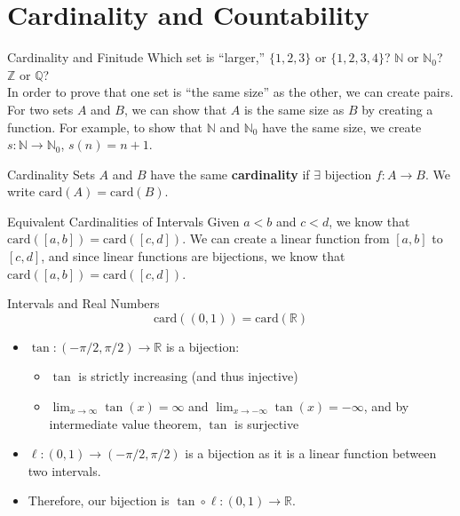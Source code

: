 \documentclass[10pt]{extarticle}
\begin{document}
  \section*{Cardinality and Countability}%
  \begin{problem}{Cardinality and Finitude}
    Which set is ``larger,'' $\{1,2,3\}$ or $\{1,2,3,4\}$? $\mathbb{N}$ or $\mathbb{N}_0$? $\mathbb{Z}$ or $\mathbb{Q}$?\\

    In order to prove that one set is ``the same size'' as the other, we can create pairs. For two sets $A$ and $B$, we can show that $A$ is the same size as $B$ by creating a function. For example, to show that $\mathbb{N}$ and $\mathbb{N}_0$ have the same size, we create $s:\mathbb{N} \rightarrow \mathbb{N}_0$, $s(n) = n+1$.

    \begin{problem}{Cardinality}
      Sets $A$ and $B$ have the same \textbf{cardinality} if $\exists$ bijection $f:A\rightarrow B$. We write $\text{card}(A) = \text{card}(B)$.
    \end{problem}
    \begin{problem}{Equivalent Cardinalities of Intervals}
      Given $a<b$ and $c<d$, we know that $\text{card}\left([a,b]\right) = \text{card}\left([c,d]\right)$.
      \tcblower
      We can create a linear function from $[a,b]$ to $[c,d]$, and since linear functions are bijections, we know that $\text{card}\left([a,b]\right) = \text{card}\left([c,d]\right)$.
    \end{problem}
    \begin{problem}{Intervals and Real Numbers}
      \[
        \text{card}\left((0,1)\right) = \text{card}(\mathbb{R})
      \] 
      \tcblower
      \begin{itemize}
        \item $\tan: (-\pi/2,\pi/2) \rightarrow \mathbb{R}$ is a bijection:
          \begin{itemize}
            \item $\tan$ is strictly increasing (and thus injective)
            \item $\lim_{x\rightarrow\infty} \tan(x) = \infty$ and $\lim_{x\rightarrow -\infty}\tan(x) = -\infty$, and by intermediate value theorem, $\tan$ is surjective
          \end{itemize}
        \item $\ell: (0,1) \rightarrow (-\pi/2,\pi/2)$ is a bijection as it is a linear function between two intervals.
        \item Therefore, our bijection is $\tan \circ \ell: (0,1) \rightarrow \mathbb{R}$.

\end{itemize}
\end{problem}
\end{problem}
\end{document}
